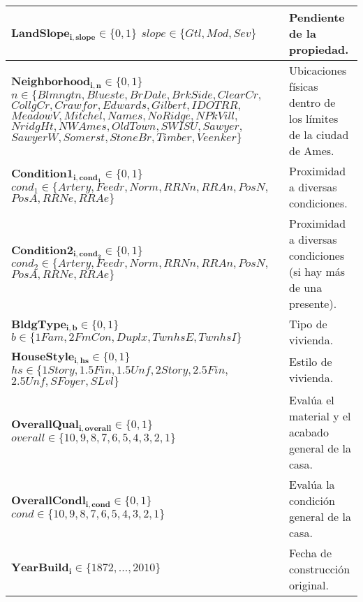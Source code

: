 \begin{longtable}{ | p{8cm} | p{5cm} | }
    \hline
    $\boldsymbol{LandSlope_{i, slope}} \in \{0, 1\}$ \newline $slope \in \{Gtl, Mod, Sev\}$ & Pendiente de la propiedad. \\
    \hline
    $\boldsymbol{Neighborhood_{i, n}} \in \{0, 1\}$ \newline $n \in \{Blmngtn, Blueste, BrDale, BrkSide, ClearCr,$\newline$CollgCr, Crawfor, Edwards, Gilbert, IDOTRR,$\newline$ MeadowV, Mitchel, Names, NoRidge, NPkVill,$\newline$ NridgHt, NWAmes, OldTown, SWISU, Sawyer,$\newline$ SawyerW, Somerst, StoneBr, Timber, Veenker\}$ & Ubicaciones físicas dentro de los límites de la ciudad de Ames. \\
    \hline
    $\boldsymbol{Condition1_{i, cond_{1}}} \in \{0, 1\}$ \newline $cond_{1} \in \{Artery, Feedr, Norm, RRNn, RRAn, PosN,$\newline$ PosA, RRNe, RRAe\}$ & Proximidad a diversas condiciones. \\
    \hline
    $\boldsymbol{Condition2_{i, cond_{2}}} \in \{0, 1\}$ \newline $cond_{2} \in \{Artery, Feedr, Norm, RRNn, RRAn, PosN,$\newline$ PosA, RRNe, RRAe\}$ & Proximidad a diversas condiciones (si hay más de una presente).\\
    \hline
    $\boldsymbol{BldgType_{i, b}} \in \{0, 1\}$ \newline $b\in \{1Fam, 2FmCon, Duplx, TwnhsE, TwnhsI\}$ & Tipo de vivienda. \\
    \hline
    $\boldsymbol{HouseStyle_{i, hs}} \in \{0, 1\}$ \newline $hs \in \{1Story, 1.5Fin, 1.5Unf, 2Story, 2.5Fin,$\newline $ 2.5Unf, SFoyer,SLvl\}$ & Estilo de vivienda.\\
    \hline
    $\boldsymbol{OverallQual_{i, overall}} \in \{0, 1\}$ \newline $overall \in \{10, 9, 8, 7, 6, 5, 4, 3, 2, 1\}$ & Evalúa el material y el acabado general de la casa. \\
    \hline
    $\boldsymbol{OverallCondl_{i, cond}} \in \{0, 1\}$ \newline $cond \in \{10, 9, 8, 7, 6, 5, 4, 3, 2, 1\}$ & Evalúa la condición general de la casa.\\
    \hline
    $\boldsymbol{YearBuild_{i}} \in \{1872, ..., 2010\}$ & Fecha de construcción original.\\

\end{longtable}
